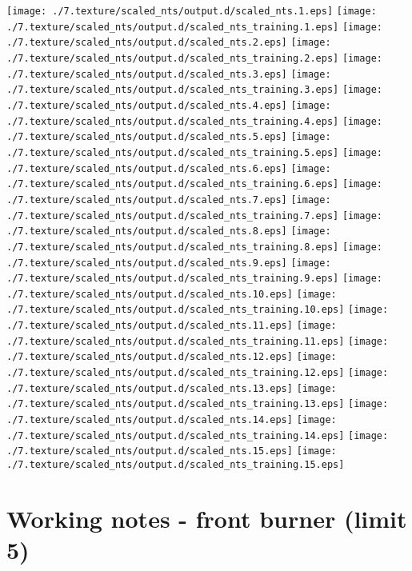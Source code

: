 \documentclass{book}
\begin{document}
 \texttt{[image: ./7.texture/scaled\_nts/output.d/scaled\_nts.1.eps]}
\texttt{[image: ./7.texture/scaled\_nts/output.d/scaled\_nts\_training.1.eps]}
\texttt{[image: ./7.texture/scaled\_nts/output.d/scaled\_nts.2.eps]}
\texttt{[image: ./7.texture/scaled\_nts/output.d/scaled\_nts\_training.2.eps]}
\texttt{[image: ./7.texture/scaled\_nts/output.d/scaled\_nts.3.eps]}
\texttt{[image: ./7.texture/scaled\_nts/output.d/scaled\_nts\_training.3.eps]}
\texttt{[image: ./7.texture/scaled\_nts/output.d/scaled\_nts.4.eps]}
\texttt{[image: ./7.texture/scaled\_nts/output.d/scaled\_nts\_training.4.eps]}
\texttt{[image: ./7.texture/scaled\_nts/output.d/scaled\_nts.5.eps]}
\texttt{[image: ./7.texture/scaled\_nts/output.d/scaled\_nts\_training.5.eps]}
\texttt{[image: ./7.texture/scaled\_nts/output.d/scaled\_nts.6.eps]}
\texttt{[image: ./7.texture/scaled\_nts/output.d/scaled\_nts\_training.6.eps]}
\texttt{[image: ./7.texture/scaled\_nts/output.d/scaled\_nts.7.eps]}
\texttt{[image: ./7.texture/scaled\_nts/output.d/scaled\_nts\_training.7.eps]}
\texttt{[image: ./7.texture/scaled\_nts/output.d/scaled\_nts.8.eps]}
\texttt{[image: ./7.texture/scaled\_nts/output.d/scaled\_nts\_training.8.eps]}
\texttt{[image: ./7.texture/scaled\_nts/output.d/scaled\_nts.9.eps]}
\texttt{[image: ./7.texture/scaled\_nts/output.d/scaled\_nts\_training.9.eps]}
\texttt{[image: ./7.texture/scaled\_nts/output.d/scaled\_nts.10.eps]}
\texttt{[image: ./7.texture/scaled\_nts/output.d/scaled\_nts\_training.10.eps]}
\texttt{[image: ./7.texture/scaled\_nts/output.d/scaled\_nts.11.eps]}
\texttt{[image: ./7.texture/scaled\_nts/output.d/scaled\_nts\_training.11.eps]}
\texttt{[image: ./7.texture/scaled\_nts/output.d/scaled\_nts.12.eps]}
\texttt{[image: ./7.texture/scaled\_nts/output.d/scaled\_nts\_training.12.eps]}
\texttt{[image: ./7.texture/scaled\_nts/output.d/scaled\_nts.13.eps]}
\texttt{[image: ./7.texture/scaled\_nts/output.d/scaled\_nts\_training.13.eps]}
\texttt{[image: ./7.texture/scaled\_nts/output.d/scaled\_nts.14.eps]}
\texttt{[image: ./7.texture/scaled\_nts/output.d/scaled\_nts\_training.14.eps]}
\texttt{[image: ./7.texture/scaled\_nts/output.d/scaled\_nts.15.eps]}
\texttt{[image: ./7.texture/scaled\_nts/output.d/scaled\_nts\_training.15.eps]}
\chapter{Working notes - front burner (limit 5)}
\label{sec-3}
\end{document}
